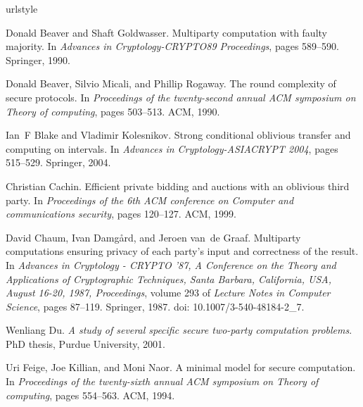 \documentclass[11pt, letterpaper, romanappendices, onecolumn]{article}
\theoremstyle{plain}\newtheorem{thm}{Theorem}[section]
\theoremstyle{definition}
\theoremstyle{remark}
\begin{document}
\begin{thebibliography}{18}
\providecommand{\natexlab}[1]{#1}
\providecommand{\url}[1]{\texttt{#1}}
\expandafter\ifx\csname urlstyle\endcsname\relax
  \providecommand{\doi}[1]{doi: #1}\else
  \providecommand{\doi}{doi: \begingroup \urlstyle{rm}\Url}\fi

Donald Beaver and Shaft Goldwasser.
\newblock Multiparty computation with faulty majority.
\newblock In \emph{Advances in Cryptology-CRYPTO89 Proceedings}, pages
  589--590. Springer, 1990.

Donald Beaver, Silvio Micali, and Phillip Rogaway.
\newblock The round complexity of secure protocols.
\newblock In \emph{Proceedings of the twenty-second annual ACM symposium on
  Theory of computing}, pages 503--513. ACM, 1990.

Ian~F Blake and Vladimir Kolesnikov.
\newblock Strong conditional oblivious transfer and computing on intervals.
\newblock In \emph{Advances in Cryptology-ASIACRYPT 2004}, pages 515--529.
  Springer, 2004.

Christian Cachin.
\newblock Efficient private bidding and auctions with an oblivious third party.
\newblock In \emph{Proceedings of the 6th ACM conference on Computer and
  communications security}, pages 120--127. ACM, 1999.

David Chaum, Ivan Damgård, and Jeroen van~de Graaf.
\newblock Multiparty computations ensuring privacy of each party's input and
  correctness of the result.
\newblock In \emph{Advances in Cryptology - CRYPTO '87, A Conference on the
  Theory and Applications of Cryptographic Techniques, Santa Barbara,
  California, USA, August 16-20, 1987, Proceedings}, volume 293 of
  \emph{Lecture Notes in Computer Science}, pages 87--119. Springer, 1987.
\newblock \doi{10.1007/3-540-48184-2_7}.

Wenliang Du.
\newblock \emph{A study of several specific secure two-party computation
  problems}.
\newblock PhD thesis, Purdue University, 2001.

Uri Feige, Joe Killian, and Moni Naor.
\newblock A minimal model for secure computation.
\newblock In \emph{Proceedings of the twenty-sixth annual ACM symposium on
  Theory of computing}, pages 554--563. ACM, 1994.


\end{thebibliography}
\end{document}
